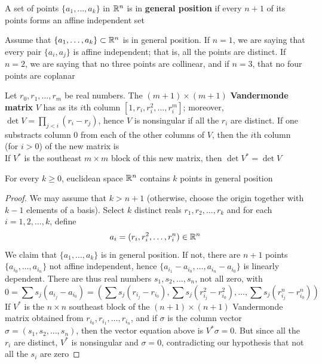\documentclass[11pt]{article}
\begin{document}
\begin{definition}[]
A set of points \(\{a_1,\dots,a_k\}\) in \(\mathbb{R}^n\) is in \textbf{general position} if every \(n+1\) of its points
forms an affine independent set
\end{definition}

Assume that \(\{a_1,\dots,a_k\}\subset\mathbb{R}^n\) is in general position. If \(n=1\), we are saying that every
pair \(\{a_i,a_j\}\) is affine independent; that is, all the points are distinct. If \(n=2\), we are
saying that no three points are collinear, and if \(n=3\), that no four points are coplanar

Let \(r_0,r_1,\dots,r_m\) be real numbers. The \((m+1)\times(m+1)\) \textbf{Vandermonde matrix} \(V\) has as
its \(i\)th column \([1,r_i,r_i^2,\dots,r_i^m]\); moreover, \(\det V=\prod_{j<i}(r_i-r_j)\), hence \(V\) is
nonsingular if all the \(r_i\) are distinct. If one substracts column 0 from each of the other
columns of \(V\), then the \(i\)th column (for \(i>0\)) of the new matrix is
\begin{equation*}
[0,r_i-r_0,r_i^2-r_0^2,\dots,r_i^m-r_0^m]
\end{equation*}
If \(V^*\) is the southeast \(m\times m\) block of this new matrix, then \(\det V^*=\det V\)

\begin{theorem}[]
For every \(k\ge 0\), euclidean space \(\mathbb{R}^n\) contains \(k\) points in general position
\end{theorem}

\begin{proof}
We may assume that \(k>n+1\) (otherwise, choose the origin together with \(k-1\) elements of a
basis). Select \(k\) distinct reals \(r_1,r_2,\dots,r_k\) and for each \(i=1,2,\dots, k\), define
\begin{equation*}
a_i=(r_i,r_i^2,\dots,r_i^n)\in\mathbb{R}^n
\end{equation*}
We claim that \(\{a_1,\dots,a_k\}\) is in general position. If not, there are \(n+1\)
points \(\{a_{i_0},\dots,a_{i_n}\}\) not affine independent,
hence \(\{a_{i_1}-a_{i_0},\dots,a_{i_n}-a_{i_0}\}\) is linearly dependent. There are thus real
numbers \(s_1,s_2,\dots,s_n\), not all zero, with
\begin{equation*}
0=\sum s_j(a_{i_j}-a_{i_0})=(\sum s_j(r_{i_j}-r_{i_0}),
\sum s_j(r_{i_j}^2-r_{i_0}^2),\dots,\sum s_j(r_{i_j}^n-r_{i_0}^n))
\end{equation*}
If \(V^*\) is the \(n\times n\) southeast block of the \((n+1)\times(n+1)\) Vandermonde matrix obtained
from \(r_{i_0},r_{i_1},\dots,r_{i_n}\), and if \(\sigma\) is the column vector \(\sigma=(s_1,s_2,\dots,s_n)\), then the
vector equation above is \(V^*\sigma=0\). But since all the \(r_i\) are distinct, \(V^*\) is
nonsingular and \(\sigma=0\), contradicting our hypothesis that not all the \(s_i\) are zero
\end{proof}
\end{document}
